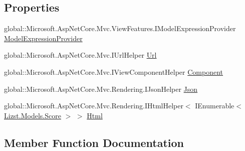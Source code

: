 \subsection*{Properties}
\begin{DoxyCompactItemize}
\item 
global\+::\+Microsoft.\+Asp\+Net\+Core.\+Mvc.\+View\+Features.\+I\+Model\+Expression\+Provider \mbox{\hyperlink{class_asp_net_core_1_1_views___results___index_a3f41add34eca3e0d44a51b46c9fc9bc6}{Model\+Expression\+Provider}}
\item 
global\+::\+Microsoft.\+Asp\+Net\+Core.\+Mvc.\+I\+Url\+Helper \mbox{\hyperlink{class_asp_net_core_1_1_views___results___index_a15c72239e78ad087f9e7cbf78747d316}{Url}}
\item 
global\+::\+Microsoft.\+Asp\+Net\+Core.\+Mvc.\+I\+View\+Component\+Helper \mbox{\hyperlink{class_asp_net_core_1_1_views___results___index_a8db48a16bb88c394fedef9c0e402b9e2}{Component}}
\item 
global\+::\+Microsoft.\+Asp\+Net\+Core.\+Mvc.\+Rendering.\+I\+Json\+Helper \mbox{\hyperlink{class_asp_net_core_1_1_views___results___index_ae1c64cbfe045bd3262a56760b42031d9}{Json}}
\item 
global\+::\+Microsoft.\+Asp\+Net\+Core.\+Mvc.\+Rendering.\+I\+Html\+Helper$<$ I\+Enumerable$<$ \mbox{\hyperlink{class_lizst_1_1_models_1_1_score}{Lizst.\+Models.\+Score}} $>$ $>$ \mbox{\hyperlink{class_asp_net_core_1_1_views___results___index_aac40d06daf2e311ba4d4dcd61f1126b7}{Html}}
\end{DoxyCompactItemize}


\subsection{Member Function Documentation}
\mbox{\label{class_asp_net_core_1_1_views___results___index_ac6216b70dd3eb7a02b5537f19fec208f}} 
